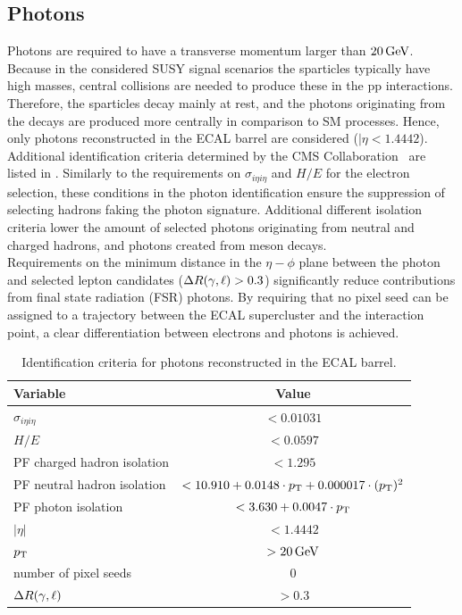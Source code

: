 \subsection{Photons}
Photons are required to have a transverse momentum larger than $20\,\text{Ge\hspace{-.08em}V}$. Because in the considered SUSY signal scenarios the sparticles typically have high masses, central collisions are needed to produce these in the pp interactions. Therefore, the sparticles decay mainly at rest, and the photons originating from the decays are produced more centrally in comparison to SM processes. Hence, only photons reconstructed in the ECAL barrel are considered ($|\eta<1.4442$). Additional identification criteria determined by the CMS Collaboration~\cite{photonID} are listed in .
Similarly to the requirements on $\sigma_{i\eta i\eta}$ and $H/E$ for the electron selection, these conditions in the photon identification ensure the suppression of selecting hadrons faking the photon signature. Additional different isolation criteria lower the amount of selected photons originating from neutral and charged hadrons, and photons created from meson decays.\\
Requirements on the minimum distance in the $\eta-\phi$ plane between the photon and selected lepton candidates ($\Delta R(\gamma,\ell)>0.3$) significantly reduce contributions from final state radiation (FSR) photons. By requiring that no pixel seed can be assigned to a trajectory between the ECAL supercluster and the interaction point, a clear differentiation between electrons and photons is achieved.
\begin{table}[b]
 \centering
 \caption{Identification criteria for photons reconstructed in the ECAL barrel.}
 \label{tab:photonID}
 \begin{tabular}{lc}
  Variable                    & Value                                                \\\hline
  $\sigma_{i\eta i\eta}$      & $<0.01031$                                           \\
  $H/E$                       & $<0.0597$                                            \\
  PF charged hadron isolation & $<1.295$                                             \\
  PF neutral hadron isolation & $<10.910 + 0.0148 \cdot p_{\mathrm{T}} + 0.000017\cdot (p_{\mathrm{T}})^2$ \\
  PF photon isolation         & $<3.630+0.0047\cdot p_{\mathrm{T}}$                             \\\hline
  $|\eta|$                    & $<1.4442$                                            \\
  $p_{\mathrm{T}}$                       & $>20\,\text{Ge\hspace{-.08em}V}$                                            \\
  number of pixel seeds       & $0$                                                  \\
  $\Delta R (\gamma,\ell)$      & $>0.3$                                               \\\hline
 \end{tabular}
 \vspace{\baselineskip}
\end{table}
